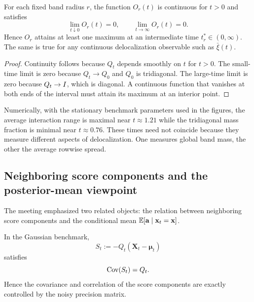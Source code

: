 \documentclass[11pt]{article}
\begin{document}
\begin{proposition}
For each fixed band radius $r$, the function $O_r(t)$ is continuous for $t>0$ and satisfies
\begin{equation}
 \lim_{t\downarrow 0}O_r(t)=0,
 \qquad
 \lim_{t\to\infty}O_r(t)=0.
\end{equation}
Hence $O_r$ attains at least one maximum at an intermediate time $t_r^*\in(0,\infty)$.
The same is true for any continuous delocalization observable such as $\bar\xi(t)$.
\end{proposition}

\begin{proof}
Continuity follows because $Q_t$ depends smoothly on $t$ for $t>0$. The small-time limit is zero because $Q_t\to Q_0$ and $Q_0$ is tridiagonal. The large-time limit is zero because $Q_t\to I$, which is diagonal. A continuous function that vanishes at both ends of the interval must attain its maximum at an interior point.
\end{proof}

Numerically, with the stationary benchmark parameters used in the figures, the average interaction range is maximal near $t\approx 1.21$ while the tridiagonal mass fraction is minimal near $t\approx 0.76$. These times need not coincide because they measure different aspects of delocalization. One measures global band mass, the other the average rowwise spread.

\subsection{Neighboring score components and the posterior-mean viewpoint}

The meeting emphasized two related objects: the relation between neighboring score components and the conditional mean $\mathbb{E}[\mathbf a\mid \mathbf x_t=\mathbf x]$.

\begin{proposition}\label{prop:score_cov}
In the Gaussian benchmark,
\begin{equation}
 S_t:=-Q_t(\mathbf X_t-\boldsymbol\mu_t)
\end{equation}
satisfies
\begin{equation}
 \operatorname{Cov}(S_t)=Q_t.
\end{equation}
Hence the covariance and correlation of the score components are exactly controlled by the noisy precision matrix.
\end{proposition}
\end{document}

